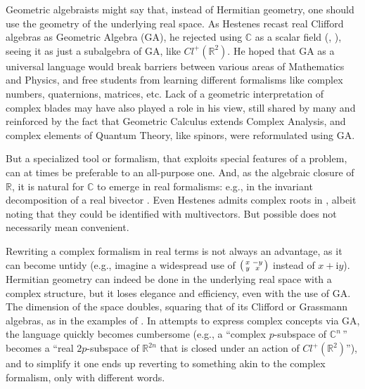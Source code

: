 \documentclass{birkjour}
\theoremstyle{definition}
\def\R			{\mathds{R}}
\def\C			{\mathds{C}}
\def\im	 					{\mathrm{i}}				%
\begin{document}
Geometric algebraists might say that, instead of Hermitian geometry, one should use the geometry of the underlying real space.
As Hestenes recast real Clifford algebras as Geometric Algebra (GA), he rejected using $\C$ as a scalar field (\hspace{1sp}\cite[pp.\,9--11]{Hestenes1986unified}, \cite[pp.\,xii--xiii]{Hestenes1984}), seeing it as just a subalgebra of GA, like $\mathit{Cl}^+(\R^2)$.
He hoped that GA as a universal language would break barriers between various areas of Mathematics and Physics, and free students from learning different formalisms like complex numbers, quaternions, matrices, etc.
Lack of a geometric interpretation of complex blades may have also played a role in his view, still shared by many and reinforced by the fact that Geometric Calculus extends Complex Analysis, and complex elements of Quantum Theory, like spinors, were reformulated using GA.

But a specialized tool or formalism, that exploits special features of a problem, can at times be preferable to an all-purpose one.
And, as the algebraic closure of $\R$, it is natural for $\C$ to emerge in real formalisms:
e.g., in the invariant decomposition of a real bivector \cite{Roelfs2023}.
Even Hestenes admits complex roots in \cite[p.\,74]{Hestenes1984}, albeit noting that they could be identified with multivectors.
But possible does not necessarily mean convenient.

Rewriting a complex formalism in real terms is not always an advantage, as it can become untidy (e.g., imagine a widespread use of 
$\begin{psmallmatrix}
	x & -y \\
	y & x
\end{psmallmatrix}$ instead of $x+\im y$).
Hermitian geometry can indeed be done in the underlying real space with a complex structure, but it loses elegance and efficiency, even with the use of GA.
The dimension of the space doubles, squaring that of its Clifford or Grassmann algebras, as in the examples of .
In attempts to express complex concepts via GA,
the language quickly becomes cumbersome
(e.g., a ``complex $p$-subspace of $\C^n\,$'' becomes a ``real $2p$-subspace of $\R^{2n}$ that is closed under an action of $\mathit{Cl}^+(\R^2)$''),
and to simplify it one ends up reverting to something akin to the complex formalism, only with different words.
\end{document}
